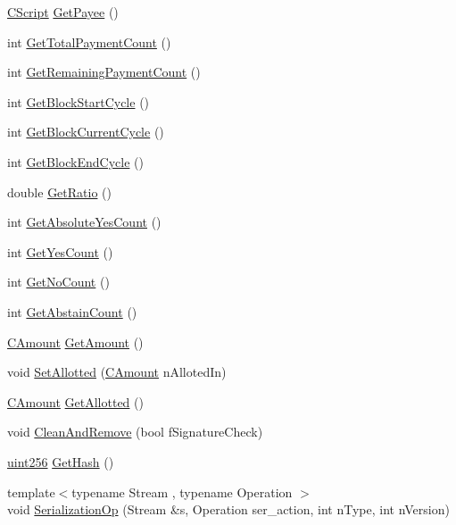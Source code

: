 \begin{DoxyCompactItemize}
\item 
\hyperlink{class_c_script}{C\+Script} \hyperlink{class_c_budget_proposal_a5489ea6b1dd54e25c2a0a52ef67e71a1}{Get\+Payee} ()
\item 
int \hyperlink{class_c_budget_proposal_a54cc431d667a7dfa1e010d6ff17a40c4}{Get\+Total\+Payment\+Count} ()
\item 
int \hyperlink{class_c_budget_proposal_a1fef390cf24f7f110c375ab6e7d01f50}{Get\+Remaining\+Payment\+Count} ()
\item 
int \hyperlink{class_c_budget_proposal_a66de6699a9cc9b084eecf014a168bab8}{Get\+Block\+Start\+Cycle} ()
\item 
int \hyperlink{class_c_budget_proposal_a33ad377cb08046ac197041fb6a06df6e}{Get\+Block\+Current\+Cycle} ()
\item 
int \hyperlink{class_c_budget_proposal_afe85ba7619fe2bf636e063550769a006}{Get\+Block\+End\+Cycle} ()
\item 
double \hyperlink{class_c_budget_proposal_aef844b5ab211003e6b93bef75a20da6e}{Get\+Ratio} ()
\item 
int \hyperlink{class_c_budget_proposal_ac3533cb49bad2a16caff3a1f5a5a7642}{Get\+Absolute\+Yes\+Count} ()
\item 
int \hyperlink{class_c_budget_proposal_adfb1010987096898eb4e820440877442}{Get\+Yes\+Count} ()
\item 
int \hyperlink{class_c_budget_proposal_abff824751942908b6babccd221911399}{Get\+No\+Count} ()
\item 
int \hyperlink{class_c_budget_proposal_a263871755bfaa3fe611655377b9d020e}{Get\+Abstain\+Count} ()
\item 
\hyperlink{amount_8h_a4eaf3a5239714d8c45b851527f7cb564}{C\+Amount} \hyperlink{class_c_budget_proposal_a2053aad4bd3c03675edf6f1ae60fff39}{Get\+Amount} ()
\item 
void \hyperlink{class_c_budget_proposal_a23188288e26d836dd95c77ee40d2e18e}{Set\+Allotted} (\hyperlink{amount_8h_a4eaf3a5239714d8c45b851527f7cb564}{C\+Amount} n\+Alloted\+In)
\item 
\hyperlink{amount_8h_a4eaf3a5239714d8c45b851527f7cb564}{C\+Amount} \hyperlink{class_c_budget_proposal_aa331bf9bfe44113a3a3ef2880b5f7936}{Get\+Allotted} ()
\item 
void \hyperlink{class_c_budget_proposal_a32204943f3efff468bcf76a92d014424}{Clean\+And\+Remove} (bool f\+Signature\+Check)
\item 
\hyperlink{classuint256}{uint256} \hyperlink{class_c_budget_proposal_a7c69d6e50ef8c4870ab5af71d37ae2b7}{Get\+Hash} ()
\item 
{\footnotesize template$<$typename Stream , typename Operation $>$ }\\void \hyperlink{class_c_budget_proposal_a583bd01ff4267cf5491033ab57a09094}{Serialization\+Op} (Stream \&s, Operation ser\+\_\+action, int n\+Type, int n\+Version)
\end{DoxyCompactItemize}
